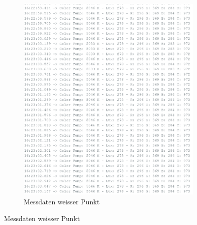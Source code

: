 \begin{figure}[H]
\begin{subfigure}{0.35\textwidth}
        \includegraphics[width=\linewidth]{img/sensortest/MD_WeisserPunkt_101ms.png}
        \caption{Messdaten weisser Punkt}
        \label{fig:MDFarbsensorWeisserPunkt}
    \end{subfigure}
    
    \vspace{0.5cm}


\end{figure}
